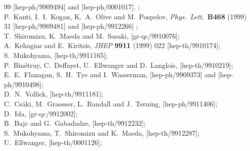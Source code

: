 \documentclass[a4paper,12pt]{article}
\begin{document}
\begin{thebibliography}{99}
[hep-ph/9909494]
and
[hep-ph/0001017].
;\\
%
P.~Kanti, I.~I.~Kogan, K.~A.~Olive and M.~Pospelov,
{\it Phys.\ Lett.}\  {\bf B468} (1999) 31
[hep-ph/9909481]
and
[hep-ph/9912266] ;\\
%
T.~Shiromizu, K.~Maeda and M.~Sasaki,
[gr-qc/9910076];\\
%
A.~Kehagias and E.~Kiritsis,
{\it JHEP} {\bf 9911} (1999) 022
[hep-th/9910174];\\
%
S.~Mukohyama,
[hep-th/9911165];\\
%
P.~Bin\'etruy, C.~Deffayet, U.~Ellwanger and D.~Langlois,
[hep-th/9910219];\\
%
E.~E.~Flanagan, S.~H.~Tye and I.~Wasserman,
[hep-ph/9909373]
and
[hep-ph/9910498];\\
%
%
D.~N.~Vollick,
[hep-th/9911181];\\
%
C.~Cs\'aki, M.~Graesser, L.~Randall and J.~Terning,
[hep-ph/9911406];\\
%
D.~Ida,
[gr-qc/9912002];\\
%
B.~Bajc and G.~Gabadadze,
[hep-th/9912232];\\
%
S.~Mukohyama, T.~Shiromizu and K.~Maeda,
[hep-th/9912287];\\
%
U.~Ellwanger,
[hep-th/0001126];\\

\end{thebibliography}
\end{document}
